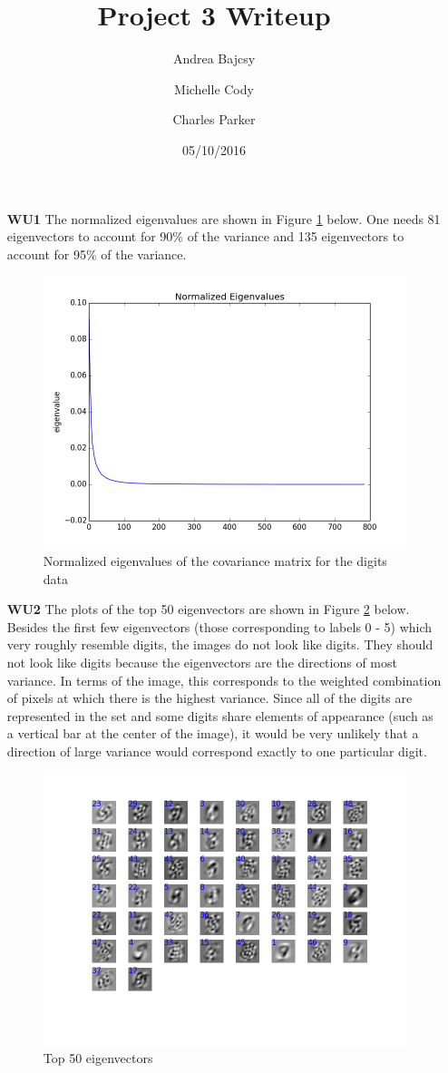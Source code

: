 \documentclass{article}
\title{Project 3 Writeup}
\date{05/10/2016}
\author{Andrea Bajcsy \and Michelle Cody \and Charles Parker }
\begin{document}
	\maketitle
	
	\begin{enumerate}
	
	\item[\textbf{WU1}] The normalized eigenvalues are shown in Figure \ref{fig:WU1} below. One needs 81 eigenvectors to account for 90\% of the variance and 135 eigenvectors to account for 95\% of the variance.
	
	\begin{figure}[h!]
		\centering
		\includegraphics[width=.5\textwidth]{normalized_eigenvalues.png}
		\caption{Normalized eigenvalues of the covariance matrix for the digits data}
		\label{fig:WU1}
	\end{figure}

	\FloatBarrier

	\item[\textbf{WU2}] The plots of the top 50 eigenvectors are shown in Figure \ref{fig:WU2} below. Besides the first few eigenvectors (those corresponding to labels 0 - 5) which very roughly resemble digits, the images do not look like digits. They should not look like digits because the eigenvectors are the directions of most variance. In terms of the image, this corresponds to the weighted combination of pixels at which there is the highest variance. Since all of the digits are represented in the set and some digits share elements of appearance (such as a vertical bar at the center of the image), it would be very unlikely that a direction of large variance would correspond exactly to one particular digit.
	
	\begin{figure}[h!]
		\centering
		\includegraphics[width=.5\textwidth]{eigvects.png}
		\caption{Top 50 eigenvectors }
		\label{fig:WU2}
	\end{figure}
	

\end{enumerate}
\end{document}
